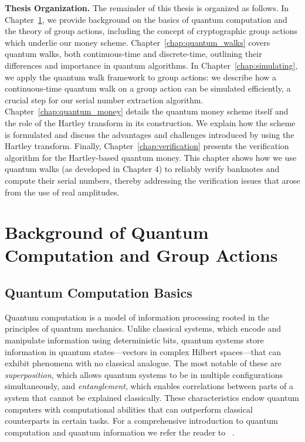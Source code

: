 \documentclass[12pt]{report}
\begin{document}
\medskip\noindent\textbf{Thesis Organization.} 
The remainder of this thesis is organized as follows. In Chapter~\ref{chap:backgound}, we provide background on the basics of quantum computation and the theory of group actions, including the concept of cryptographic group actions which underlie our money scheme. Chapter~\ref{chap:quantum_walks} covers quantum walks, both continuous-time and discrete-time, outlining their differences and importance in quantum algorithms. In Chapter~\ref{chap:simulating}, we apply the quantum walk framework to group actions: we describe how a continuous-time quantum walk on a group action can be simulated efficiently, a crucial step for our serial number extraction algorithm. Chapter~\ref{chap:quantum_money} details the quantum money scheme itself and the role of the Hartley transform in its construction. We explain how the scheme is formulated and discuss the advantages and challenges introduced by using the Hartley transform. Finally, Chapter~\ref{chap:verification} presents the verification algorithm for the Hartley-based quantum money. This chapter shows how we use quantum walks (as developed in Chapter 4) to reliably verify banknotes and compute their serial numbers, thereby addressing the verification issues that arose from the use of real amplitudes.
\vspace{1em}



\chapter{Background of Quantum Computation and Group Actions}\label{chap:backgound}



\section{Quantum Computation Basics}


Quantum computation is a model of information processing rooted in the principles of quantum mechanics. Unlike classical systems, which encode and manipulate information using deterministic bits, quantum systems store information in quantum states—vectors in complex Hilbert spaces—that can exhibit phenomena with no classical analogue. The most notable of these are \emph{superposition}, which allows quantum systems to be in multiple configurations simultaneously, and \emph{entanglement}, which enables correlations between parts of a system that cannot be explained classically. These characteristics endow quantum computers with computational abilities that can outperform classical counterparts in certain tasks. For a comprehensive introduction to quantum computation and quantum information we refer the reader to ~\cite{NielsenChuang2010, watrous2018theory, kaye2006introduction}.
\end{document}
